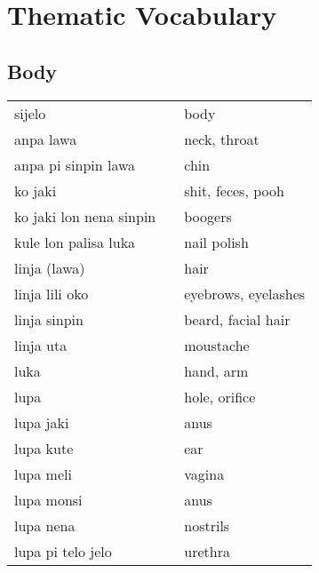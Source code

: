 \section{Thematic Vocabulary}
\label{'thematic_vocabulary'}
%
%
%
%
\subsection{Body}
%
\begin{supertabular}{p{4,5cm}|ll}
    sijelo                    &  & body                    \\
    anpa lawa                 &  & neck, throat            \\
    anpa pi sinpin lawa       &  & chin                    \\
    ko jaki                   &  & shit, feces, pooh       \\
    ko jaki lon nena sinpin   &  & boogers                 \\
    kule lon palisa luka      &  & nail polish             \\
    linja (lawa)              &  & hair                    \\
    linja lili oko            &  & eyebrows, eyelashes     \\
    linja sinpin              &  & beard, facial hair      \\
    linja uta                 &  & moustache               \\
    luka                      &  & hand, arm               \\
    lupa                      &  & hole, orifice           \\
    lupa jaki                 &  & anus                    \\
    lupa kute                 &  & ear                     \\
    lupa meli                 &  & vagina                  \\
    lupa monsi                &  & anus                    \\
    lupa nena                 &  & nostrils                \\
    lupa pi telo jelo         &  & urethra                 \\

\end{supertabular}
